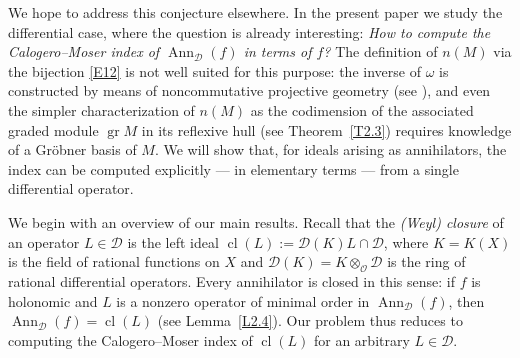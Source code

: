 \documentclass[11pt,reqno]{amsart}
\theoremstyle{plain}
\theoremstyle{definition}
\theoremstyle{remark}
\numberwithin{equation}{section}
\newcommand{\cD}{\mathcal{D}}
\newcommand{\cO}{\mathcal{O}}
\DeclareMathOperator{\Ann}{Ann}
\DeclareMathOperator{\cl}{cl}
\DeclareMathOperator{\gr}{gr}
\begin{document}
We hope to address this conjecture elsewhere. In the present paper we study the differential
case, where the question is already interesting: 
\emph{How to compute the Calogero--Moser index of
$\Ann_{\cD}(f)$ in terms of $f$?} The definition of $n(M)$ via the bijection \eqref{E12} is not
well suited for this purpose: the inverse of $\omega$ is constructed by means of noncommutative
projective geometry (see \cite{BerestWilsonNC, BerestChalykhIdeals}), and even the simpler
characterization of $n(M)$ as the codimension of the associated graded module $\gr M$ in its
reflexive hull (see Theorem~\ref{T2.3}) requires  knowledge of a Gr\"obner basis of $M$. We will
show that, for ideals arising as annihilators, the index can be computed explicitly --- in elementary terms --- from a single differential operator.

We begin with an overview of our main results. Recall that the \emph{(Weyl) closure} of an
operator $L \in \cD$ is the left ideal $\cl(L) := \cD(K) L \cap \cD$, where $K = K(X)$ is the
field of rational functions on $X$ and $\cD(K) = K \otimes_{\cO} \cD$ is the ring of rational
differential operators. Every annihilator is closed in this sense: if $f$ is holonomic and $L$ is
a nonzero operator of minimal order in $\Ann_{\cD}(f)$, then $\Ann_{\cD}(f) = \cl(L)$ (see
Lemma~\ref{L2.4}). Our problem thus reduces to computing the Calogero--Moser index of $\cl(L)$
for an arbitrary $L \in \cD$.
\end{document}
